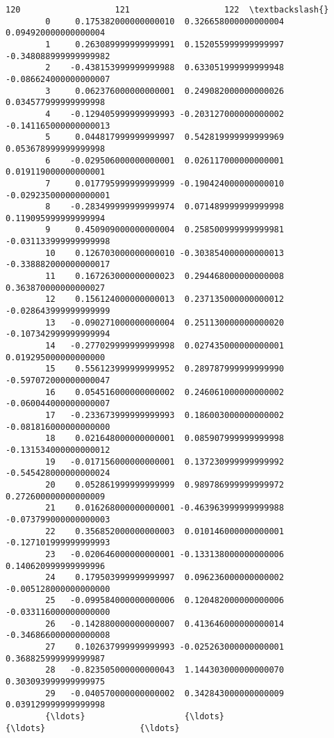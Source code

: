\documentclass[11pt]{article}
\begin{document}
\begin{Verbatim}[commandchars=\\\{\}]
                               120                   121                   122  \textbackslash{}
        0     0.175382000000000010  0.326658000000000004  0.094920000000000004   
        1     0.263089999999999991  0.152055999999999997 -0.348088999999999982   
        2    -0.438153999999999988  0.633051999999999948 -0.086624000000000007   
        3     0.062376000000000001  0.249082000000000026  0.034577999999999998   
        4    -0.129405999999999993 -0.203127000000000002 -0.141165000000000013   
        5     0.044817999999999997  0.542819999999999969  0.053678999999999998   
        6    -0.029506000000000001  0.026117000000000001  0.019119000000000001   
        7     0.017795999999999999 -0.190424000000000010 -0.029235000000000001   
        8    -0.283499999999999974  0.071489999999999998  0.119095999999999994   
        9     0.450909000000000004  0.258500999999999981 -0.031133999999999998   
        10    0.126703000000000010 -0.303854000000000013 -0.338882000000000017   
        11    0.167263000000000023  0.294468000000000008  0.363870000000000027   
        12    0.156124000000000013  0.237135000000000012 -0.028643999999999999   
        13   -0.090271000000000004  0.251130000000000020 -0.107342999999999994   
        14   -0.277029999999999998  0.027435000000000001  0.019295000000000000   
        15    0.556123999999999952  0.289787999999999990 -0.597072000000000047   
        16    0.054516000000000002  0.246061000000000002 -0.060044000000000007   
        17   -0.233673999999999993  0.186003000000000002 -0.081816000000000000   
        18    0.021648000000000001  0.085907999999999998 -0.131534000000000012   
        19   -0.017156000000000001  0.137230999999999992 -0.545428000000000024   
        20    0.052861999999999999  0.989786999999999972  0.272600000000000009   
        21    0.016268000000000001 -0.463963999999999988 -0.073799000000000003   
        22    0.356852000000000003  0.010146000000000001 -0.127101999999999993   
        23   -0.020646000000000001 -0.133138000000000006  0.140620999999999996   
        24    0.179503999999999997  0.096236000000000002 -0.005128000000000000   
        25   -0.099584000000000006  0.120482000000000006 -0.033116000000000000   
        26   -0.142880000000000007  0.413646000000000014 -0.346866000000000008   
        27    0.102637999999999993 -0.025263000000000001  0.368825999999999987   
        28   -0.823505000000000043  1.144303000000000070  0.303093999999999975   
        29   -0.040570000000000002  0.342843000000000009  0.039129999999999998   
        {\ldots}                    {\ldots}                   {\ldots}                   {\ldots}   

\end{Verbatim}
\end{document}

